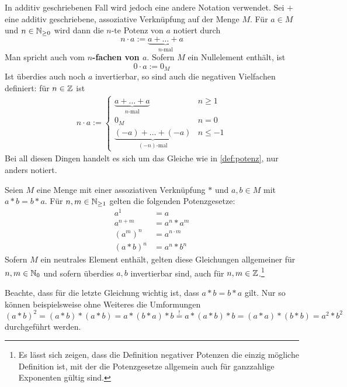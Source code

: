     
\begin{nota}
    In additiv geschriebenen Fall wird jedoch eine andere Notation verwendet. Sei $+$ eine additiv geschriebene, assoziative Verknüpfung auf der Menge $M$. Für $a\in M$ und $n\in \mathbb N_{\ge 0}$ wird dann die $n$-te Potenz von $a$ notiert durch
        \[ n \cdot a := \underbrace{a + \ldots + a}_{n\text{-mal}} \]
    Man spricht auch vom \textbf{$n$-fachen von $a$}. Sofern $M$ ein Nullelement enthält, ist
        \[ 0\cdot a := 0_M \]
    Ist überdies auch noch $a$ invertierbar, so sind auch die negativen Vielfachen definiert: für $n\in \mathbb Z$ ist
    \begin{align*}
        n \cdot a := \begin{cases}
            \underbrace{a+ \ldots + a}_{n\text{-mal}} & n \ge 1 \\
            0_M & n= 0 \\
            \underbrace{(-a) + \ldots +  (-a)}_{(-n)\text{-mal}} & n \le -1
        \end{cases}
    \end{align*}
    Bei all diesen Dingen handelt es sich um das Gleiche wie in \cref{def:potenz}, nur anders notiert.
\end{nota}


\begin{satz}[* Potenzgesetze] \label{potenzgesetze}
    Seien $M$ eine Menge mit einer assoziativen Verknüpfung $*$ und $a,b\in M$ mit $a*b=b*a$. Für $n,m\in \mathbb N_{\ge 1}$ gelten die folgenden Potenzgesetze:
    \begin{align*}
        a^1 & = a \\
        a^{n+m} & = a^n* a^m \\
        (a^m)^n & = a^{n\cdot m} \\
        (a*b)^n &= a^n*b^n
    \end{align*}
    Sofern $M$ ein neutrales Element enthält, gelten diese Gleichungen allgemeiner für $n,m\in \mathbb N_0$ und sofern überdies $a,b$ invertierbar sind, auch für $n,m\in \mathbb Z$.\footnote{Es lässt sich zeigen, dass die Definition negativer Potenzen die einzig mögliche Definition ist, mit der die Potenzgesetze allgemein auch für ganzzahlige Exponenten gültig sind.}
\end{satz}


\noindent Beachte, dass für die letzte Gleichung wichtig ist, dass $a*b=b*a$ gilt. Nur so können beispielsweise ohne Weiteres die Umformungen
    \[ (a*b)^2 = (a*b)*(a*b) = a*(b*a)*b \overset{!}{=} a*(a*b)*b = (a*a)*(b*b) = a^2*b^2 \] 
durchgeführt werden.

